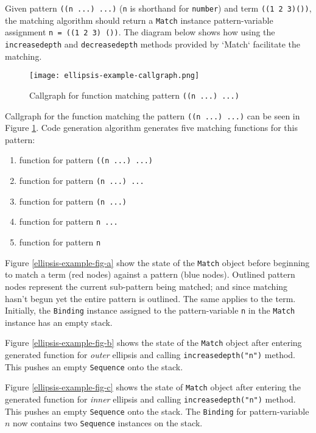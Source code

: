 
Given pattern \texttt{((n ...) ...)} (\texttt{n} is shorthand for \texttt{number}) and term \texttt{((1 2 3)())}, the matching algorithm should return a \texttt{Match} instance pattern-variable assignment \texttt{n = ((1 2 3) ())}. The diagram below shows how using the \texttt{increasedepth} and \texttt{decreasedepth} methods provided by `Match` facilitate the matching.

\begin{figure}[h]
\texttt{[image: ellipsis-example-callgraph.png]}
\caption{Callgraph for function matching pattern \texttt{((n ...) ...)}}
\label{ellipsis-example-callgraph}
\end{figure}

Callgraph for the function matching the pattern \texttt{((n ...) ...)} can be seen in Figure \ref{ellipsis-example-callgraph}. Code generation algorithm generates five matching functions for this pattern:

\begin{enumerate}
\item function for pattern \texttt{((n ...) ...)}
\item function for pattern \texttt{(n ...) ...}
\item function for pattern \texttt{(n ...) }
\item function for pattern \texttt{n ... }
\item function for pattern \texttt{n}
\end{enumerate}

Figure \ref{ellipsis-example-fig-a} show the state of the \texttt{Match} object before beginning to match a term (red nodes) against a pattern (blue nodes). Outlined pattern nodes represent the current sub-pattern being matched; and since matching hasn't begun yet the entire pattern is outlined. The same applies to the term. Initially, the \texttt{Binding} instance assigned to the pattern-variable \texttt{n} in the \texttt{Match} instance has an empty stack.

Figure \ref{ellipsis-example-fig-b} shows the state of the \texttt{Match} object after entering generated function for \textit{outer} ellipsis and calling \texttt{increasedepth("n")} method. This pushes an empty \texttt{Sequence} onto the stack.


Figure \ref{ellipsis-example-fig-c} shows the state of \texttt{Match} object after entering the generated function for \textit{inner} ellipsis and calling \texttt{increasedepth("n")} method. This pushes an empty \texttt{Sequence} onto the stack. The \texttt{Binding} for pattern-variable $n$ now contains two \texttt{Sequence} instances on the stack.

